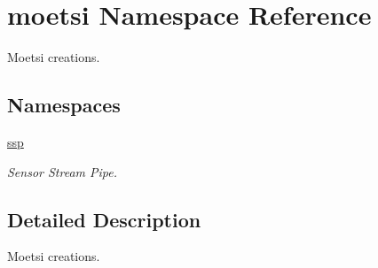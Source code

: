 \hypertarget{namespacemoetsi}{}\section{moetsi Namespace Reference}
\label{namespacemoetsi}


Moetsi creations.  


\subsection*{Namespaces}
\begin{DoxyCompactItemize}
\item 
 \hyperlink{namespacemoetsi_1_1ssp}{ssp}
\begin{DoxyCompactList}\small\item\em Sensor Stream Pipe. \end{DoxyCompactList}\end{DoxyCompactItemize}


\subsection{Detailed Description}
Moetsi creations. 